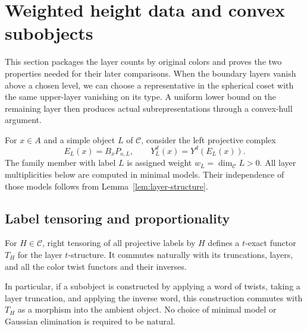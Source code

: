 \section{Weighted height data and convex subobjects}
\label{sec:height-data}

This section packages the layer counts by original colors and proves
the two properties needed for their later comparisons.  When the
boundary layers vanish above a chosen level, we can choose a
representative in the spherical coset with the same upper-layer
vanishing on its type.  A uniform lower bound on the remaining layer then
produces actual subrepresentations through a convex-hull argument.

For $x\in A$ and a simple object $L$ of $\mathscr C$, consider the
left projective complex
\begin{equation}
 E_L(x)=B_xP_{o,L},\qquad Y_L^d(x)=Y^d(E_L(x)).
 \label{eq:height-data-frame-family}
\end{equation}
The family member with label $L$ is assigned weight
$w_L=\dim_{\mathscr C}L>0$.  All layer multiplicities below are
computed in minimal models.  Their independence of those models
follows from Lemma~\ref{lem:layer-structure}.

\subsection{Label tensoring and proportionality}

\begin{lemma}
\label{lem:height-data-tensor-truncation}
For $H\in\mathscr C$, right tensoring of all projective labels by
$H$ defines a $t$-exact functor $T_H$ for the layer $t$-structure.
It commutes naturally with its truncations, layers, and all the
color twist functors and their inverses.

In particular, if a subobject is constructed by applying a word
of twists, taking a layer truncation, and applying the inverse
word, this construction commutes with $T_H$ as a morphism into
the ambient object.  No choice of minimal model or Gaussian
elimination is required to be natural.
\end{lemma}

